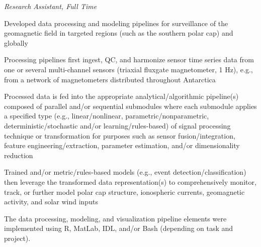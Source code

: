  \par
\textit{Research Assistant, Full Time}
\vspace{-0.8em}
\begin{itemize*}
  \item Developed data processing and modeling pipelines for
    surveillance of the geomagnetic field in targeted regions (such as
    the southern polar cap) and globally
  \item Processing pipelines first ingest, QC, and harmonize sensor time series data
    from one or several multi-channel sensors (triaxial fluxgate 
    magnetometer, 1 Hz), e.g., from a network of magnetometers 
    distributed throughout Antarctica
  \item Processed data is fed into the appropriate
    analytical/algorithmic pipeline(s) composed of parallel and/or
    sequential submodules where each submodule applies a specified type 
    (e.g., linear/nonlinear, parametric/nonparametric, deterministic/stochastic
    and/or learning/rules-based) of signal processing technique or transformation 
    for purposes such as sensor fusion/integration, feature engineering/extraction,
    parameter estimation, and/or dimensionality reduction
  \item Trained and/or metric/rules-based models (e.g., event
    detection/classification) then leverage the transformed data representation(s)
    to comprehensively monitor, track, or further model polar cap structure,
    ionospheric currents, geomagnetic activity, and solar wind inputs
  \item The data processing, modeling, and visualization pipeline
    elements were implemented using R, MatLab, IDL, and/or Bash
    (depending on task and project).
\end{itemize*}
